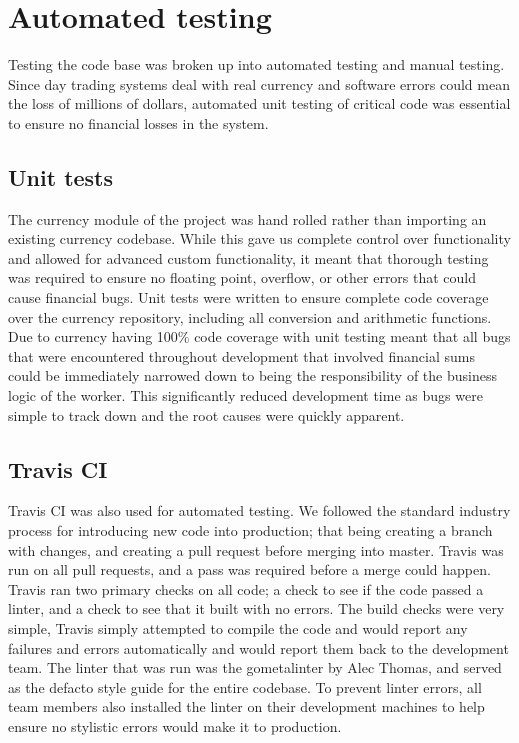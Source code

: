 \section{Automated testing}
Testing the code base was broken up into automated testing and manual testing.
Since day trading systems deal with real currency and software errors could mean the loss of millions of dollars, automated unit testing of critical code was essential to ensure no financial losses in the system.

\subsection{Unit tests}
The currency module of the project was hand rolled rather than importing an existing currency codebase.
While this gave us complete control over functionality and allowed for advanced custom functionality, it meant that thorough testing was required to ensure no floating point, overflow, or other errors that could cause financial bugs.
Unit tests were written to ensure complete code coverage over the currency repository, including all conversion and arithmetic functions.
Due to currency having 100\% code coverage with unit testing meant that all bugs that were encountered throughout development that involved financial sums could be immediately narrowed down to being the responsibility of the business logic of the worker.
This significantly reduced development time as bugs were simple to track down and the root causes were quickly apparent.

\subsection{Travis CI}
Travis CI was also used for automated testing.
We followed the standard industry process for introducing new code into production; that being creating a branch with changes, and creating a pull request before merging into master.
Travis was run on all pull requests, and a pass was required before a merge could happen.
Travis ran two primary checks on all code; a check to see if the code passed a linter, and a check to see that it built with no errors.
The build checks were very simple, Travis simply attempted to compile the code and would report any failures and errors automatically and would report them back to the development team.
The linter that was run was the gometalinter by Alec Thomas, and served as the defacto style guide for the entire codebase.
To prevent linter errors, all team members also installed the linter on their development machines to help ensure no stylistic errors would make it to production.
